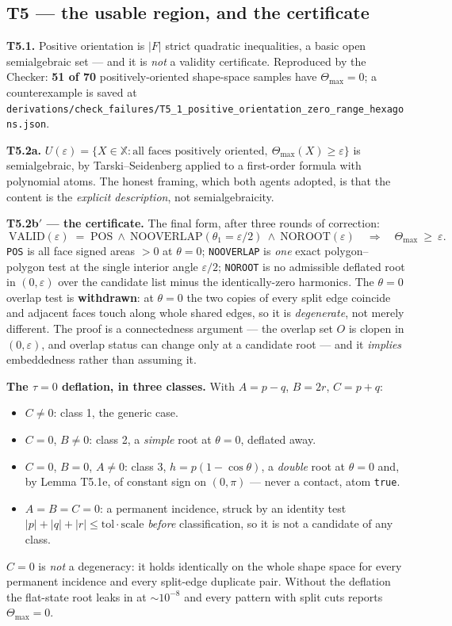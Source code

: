 \documentclass[10pt,a4paper]{article}
\newcommand{\fn}[1]{\nolinkurl{#1}}
\begin{document}
\subsection{T5 --- the usable region, and the certificate}

\textbf{T5.1.} Positive orientation is $|F|$ strict quadratic inequalities, a basic open
semialgebraic set --- and it is \emph{not} a validity certificate. Reproduced by the Checker:
\textbf{51 of 70} positively-oriented shape-space samples have $\Theta_{\max} = 0$; a
counterexample is saved at
\fn{derivations/check_failures/T5_1_positive_orientation_zero_range_hexagons.json}.

\textbf{T5.2a.} $U(\varepsilon) = \{X\in\mathbb X : \text{all faces positively oriented},\
\Theta_{\max}(X)\ge\varepsilon\}$ is semialgebraic, by Tarski--Seidenberg applied to a
first-order formula with polynomial atoms. The honest framing, which both agents adopted, is
that the content is the \emph{explicit description}, not semialgebraicity.

\textbf{T5.2b$'$ --- the certificate.} The final form, after three rounds of correction:
\[
\boxed{\ \mathrm{VALID}(\varepsilon)\;=\;
\mathrm{POS}\ \wedge\ \mathrm{NOOVERLAP}(\theta_1 = \varepsilon/2)\ \wedge\ \mathrm{NOROOT}(\varepsilon)
\quad\Longrightarrow\quad \Theta_{\max}\ \ge\ \varepsilon .\ }
\]
\texttt{POS} is all face signed areas $>0$ at $\theta=0$; \texttt{NOOVERLAP} is \emph{one} exact
polygon--polygon test at the single interior angle $\varepsilon/2$; \texttt{NOROOT} is no
admissible deflated root in $(0,\varepsilon)$ over the candidate list minus the
identically-zero harmonics. The $\theta = 0$ overlap test is \textbf{withdrawn}: at $\theta=0$
the two copies of every split edge coincide and adjacent faces touch along whole shared edges,
so it is \emph{degenerate}, not merely different. The proof is a connectedness argument --- the
overlap set $O$ is clopen in $(0,\varepsilon)$, and overlap status can change only at a
candidate root --- and it \emph{implies} embeddedness rather than assuming it.

\textbf{The $\tau=0$ deflation, in three classes.} With $A = p-q$, $B = 2r$, $C = p+q$:
\begin{itemize}[nosep,leftmargin=6mm]
\item $C\ne0$: class 1, the generic case.
\item $C = 0$, $B\ne0$: class 2, a \emph{simple} root at $\theta=0$, deflated away.
\item $C = 0$, $B = 0$, $A\ne0$: class 3, $h = p(1-\cos\theta)$, a \emph{double} root at
      $\theta=0$ and, by Lemma T5.1e, of constant sign on $(0,\pi)$ --- never a contact, atom
      \texttt{true}.
\item $A = B = C = 0$: a permanent incidence, struck by an identity test
      $|p|+|q|+|r| \le \mathrm{tol}\cdot\mathrm{scale}$ \emph{before} classification, so it is
      not a candidate of any class.
\end{itemize}
$C = 0$ is \emph{not} a degeneracy: it holds identically on the whole shape space for every
permanent incidence and every split-edge duplicate pair. Without the deflation the flat-state
root leaks in at $\sim10^{-8}$ and every pattern with split cuts reports $\Theta_{\max}=0$.
\end{document}
